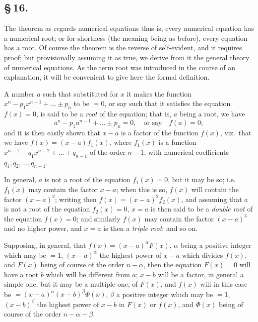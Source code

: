 \documentclass[11pt,a4paper]{article}
\begin{document}
\subsection*{\S\,16.}

The theorem as regards numerical equations thus is, every numerical equation has a numerical root; or for shortness (the meaning being as before), every equation has a root. Of course the theorem is the reverse of self-evident, and it requires proof; but provisionally assuming it as true, we derive from it the general theory of numerical equations. As the term root was introduced in the course of an explanation, it will be convenient to give here the formal definition.

A number $a$ such that substituted for $x$ it makes the function $x^{n} - p_{1}x^{n-1} + \ldots \pm p_{n}$ to be $=0$, or say such that it satisfies the equation $f(x) = 0$, is said to be a \textit{root} of the equation; that is, $a$ being a root, we have
\[
a^{n} - p_{1}a^{n-1} + \ldots \pm p_{n} = 0, \quad \text{or say} \quad f(a) = 0;
\]
and it is then easily shown that $x - a$ is a factor of the function $f(x)$, viz.\ that we have $f(x) = (x - a)f_{1}(x)$, where $f_{1}(x)$ is a function $x^{n-1} - q_{1}x^{n-2} + \ldots \pm q_{n-1}$ of the order $n - 1$, with numerical coefficients $q_{1}, q_{2}, \ldots, q_{n-1}$.

In general, $a$ is not a root of the equation $f_{1}(x) = 0$, but it may be so; i.e.\ $f_{1}(x)$ may contain the factor $x - a$; when this is so, $f(x)$ will contain the factor $(x - a)^{2}$; writing then $f(x) = (x - a)^{2}f_{2}(x)$, and assuming that $a$ is not a root of the equation $f_{2}(x) = 0$, $x = a$ is then said to be a \textit{double root} of the equation $f(x) = 0$; and similarly $f(x)$ may contain the factor $(x - a)^{3}$ and no higher power, and $x = a$ is then a \textit{triple root}; and so on.

Supposing, in general, that $f(x) = (x - a)^{\alpha}F(x)$, $\alpha$ being a positive integer which may be $=1$, $(x - a)^{\alpha}$ the highest power of $x - a$ which divides $f(x)$, and $F(x)$ being of course of the order $n - \alpha$, then the equation $F(x) = 0$ will have a root $b$ which will be different from $a$; $x - b$ will be a factor, in general a simple one, but it may be a multiple one, of $F(x)$, and $f(x)$ will in this case be $= (x - a)^{\alpha}(x - b)^{\beta}\Phi(x)$, $\beta$ a positive integer which may be $=1$, $(x - b)^{\beta}$ the highest power of $x - b$ in $F(x)$ or $f(x)$, and $\Phi(x)$ being of course of the order $n - \alpha - \beta$.
\end{document}
